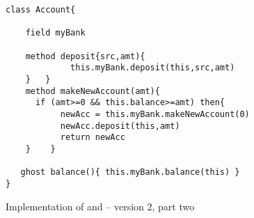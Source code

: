 \begin{figure}[htb]
\begin{lstlisting}
class Account{

    field myBank
    
    method deposit{src,amt){
             this.myBank.deposit(this,src,amt)
    }   }    
    method makeNewAccount(amt){
      if (amt>=0 && this.balance>=amt) then{
           newAcc = this.myBank.makeNewAccount(0)
           newAcc.deposit(this,amt)
           return newAcc
    }    }     

   ghost balance(){ this.myBank.balance(this) }   
}
\end{lstlisting}
 \vspace*{-7mm}
\caption{Implementation of  and  -- version 2, part two}
\label{fig:BanAccImplV2b}
\end{figure}
 